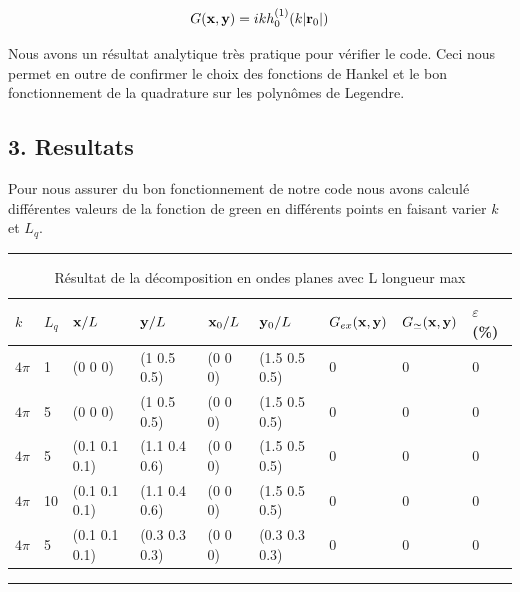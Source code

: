 \documentclass[10pt]{article}
\begin{document}
\begin{multicols}{2}
\begin{equation}
G({\bf x},{\bf y}) = ikh^{(1)}_{0}(k|{\bf r}_0|)
\end{equation}

Nous avons un résultat analytique très pratique pour vérifier le code. Ceci nous permet en outre de confirmer le choix des fonctions de Hankel et le bon fonctionnement de la quadrature sur les polynômes de Legendre. 



\vspace*{10pt}

\subsection*{3. Resultats}

Pour nous assurer du bon fonctionnement de notre code nous avons calculé différentes valeurs de la fonction de green en différents points en faisant varier $k$ et $L_q$.

\end{multicols}

\rule{8cm}{1pt}

\begin{table}[H]
\centering
\begin{tabular}{m{0.5cm} m{0.5cm} | m{2cm} m{2cm} m{2cm} m{2cm} | m{2cm} m{2cm} m{1cm}} 
   \hline
    $k$ & $L_q$ & ${\bf x}/L$ & ${\bf y}/L$ & ${\bf x}_0/L$ & ${\bf y}_0/L$ & $G_{ex}({\bf x}, {\bf y})$ & $G_{\simeq}({\bf x},{\bf y})$ & $\varepsilon$ (\%) \\
    \toprule
    \toprule
    $4\pi$ & 1 & (0 0 0) & (1 0.5 0.5) & (0 0 0) & (1.5 0.5 0.5) & 0 & 0 & 0\\
    $4\pi$ & 5 & (0 0 0) & (1 0.5 0.5) & (0 0 0) & (1.5 0.5 0.5) & 0 & 0 & 0\\ \hline
    $4\pi$ & 5 & (0.1 0.1 0.1) & (1.1 0.4 0.6) & (0 0 0) & (1.5 0.5 0.5) & 0 & 0 & 0\\
    $4\pi$ & 10 & (0.1 0.1 0.1) & (1.1 0.4 0.6) & (0 0 0) & (1.5 0.5 0.5) & 0 & 0 & 0\\ \hline
    $4\pi$ & 5 & (0.1 0.1 0.1) & (0.3 0.3 0.3) & (0 0 0) & (0.3 0.3 0.3) & 0 & 0 & 0\\
    \hline
\end{tabular}
\caption{Résultat de la décomposition en ondes planes avec L longueur max}
\end{table}



\hfill\rule{8cm}{1pt}
\end{document}
